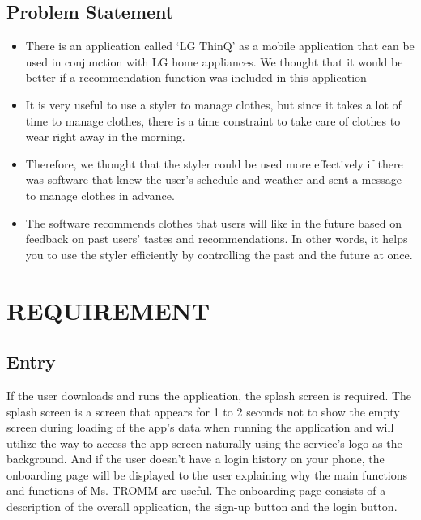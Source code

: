 \documentclass[conference]{IEEEtran}
\begin{document}
\break

\subsection{Problem Statement}\label{SCM}
\begin{itemize}
\item There is an application called ‘LG ThinQ’ as a mobile application that can be used in conjunction with LG home appliances. We thought that it would be better if a recommendation function was included in this application\\
\item It is very useful to use a styler to manage clothes, but since it takes a lot of time to manage clothes, there is a time constraint to take care of clothes to wear right away in the morning.\\
\item Therefore, we thought that the styler could be used more effectively if there was software that knew the user’s schedule and weather and sent a message to manage clothes in advance.\\
\item The software recommends clothes that users will like in the future based on feedback on past users’ tastes and recommendations. In other words, it helps you to use the styler efficiently by controlling the past and the future at once.\\
\end{itemize}

\section{REQUIREMENT}

\subsection{Entry}
If the user downloads and runs the application, the splash screen is required. The splash screen is a screen that appears for 1 to 2 seconds not to show the empty screen during loading of the app's data when running the application and will utilize the way to access the app screen naturally using the service's logo as the background. And if the user doesn’t have a login history on your phone, the onboarding page will be displayed to the user explaining why the main functions and functions of Ms. TROMM are useful. The onboarding page consists of a description of the overall application, the sign-up button and the login button.\\
\end{document}
